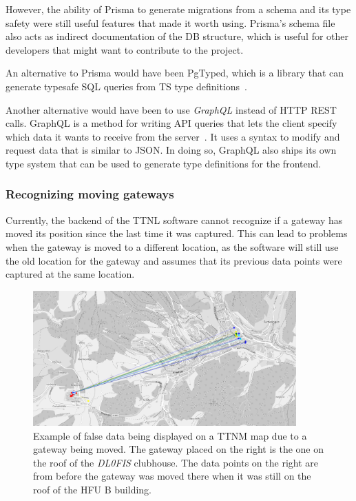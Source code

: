 However, the ability of Prisma to generate migrations from a schema and its type safety were still useful features that made it worth using.
Prisma's schema file also acts as indirect documentation of the \ac{DB} structure, which is useful for other developers that might want to contribute to the project.

An alternative to Prisma would have been PgTyped, which is a library that can generate typesafe \ac{SQL} queries from \ac{TS} type definitions~\cite{salakh_pgtyped_2023}.

Another alternative would have been to use \emph{GraphQL} instead of \ac{HTTP} \ac{REST} calls.
GraphQL is a method for writing \ac{API} queries that lets the client specify which data it wants to receive from the server~\cite{graphql_foundation_graphql_2023}.
It uses a syntax to modify and request data that is similar to \ac{JSON}.
In doing so, GraphQL also ships its own type system that can be used to generate type definitions for the frontend.

\subsubsection{Recognizing moving gateways}

Currently, the backend of the \ac{TTNL} software cannot recognize if a gateway has moved its position since the last time it was captured.
This can lead to problems when the gateway is moved to a different location, as the software will still use the old location for the gateway and assumes that its previous data
points were captured at the same location.

\begin{figure}[htbp]
    \centering
    \includegraphics[width=0.9\textwidth]{pictures/ttn-mapper/moved_gateway_example.png}
    \caption{
        Example of false data being displayed on a \acl{TTNM} map due to a gateway being moved.
        The gateway placed on the right is the one on the roof of the \emph{DL0FIS} clubhouse.
        The data points on the right are from before the gateway was moved there when it was still on the roof of the \ac{HFU} B building.
    }\label{pic:gateway-moved-example}
\end{figure}

